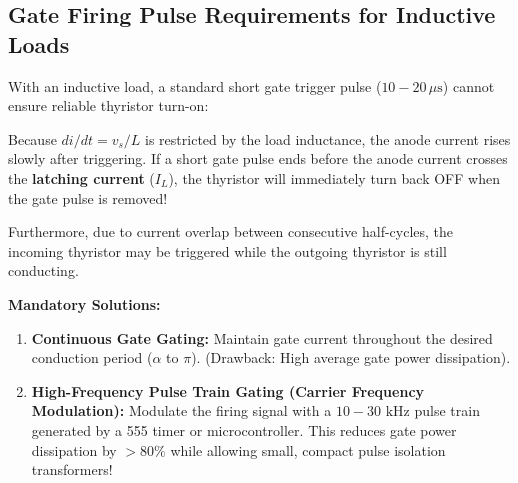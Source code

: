\documentclass[11pt,a4paper]{article}
\let\origsubsection\subsection
\renewcommand{\subsection}{\Needspace{7\baselineskip}\origsubsection}
\begin{document}
\subsection{Gate Firing Pulse Requirements for Inductive Loads}
With an inductive load, a standard short gate trigger pulse ($10 - 20\,\mu\text{s}$) cannot ensure reliable thyristor turn-on:
\begin{conceptbox}
Because $di/dt = v_s/L$ is restricted by the load inductance, the anode current rises slowly after triggering. If a short gate pulse ends before the anode current crosses the \textbf{latching current} ($I_L$), the thyristor will immediately turn back OFF when the gate pulse is removed!

Furthermore, due to current overlap between consecutive half-cycles, the incoming thyristor may be triggered while the outgoing thyristor is still conducting.

\textbf{Mandatory Solutions:}
\begin{enumerate}
  \item \textbf{Continuous Gate Gating:} Maintain gate current throughout the desired conduction period ($\alpha$ to $\pi$). (Drawback: High average gate power dissipation).
  \item \textbf{High-Frequency Pulse Train Gating (Carrier Frequency Modulation):} Modulate the firing signal with a $10 - 30\text{ kHz}$ pulse train generated by a 555 timer or microcontroller. This reduces gate power dissipation by $>80\%$ while allowing small, compact pulse isolation transformers!
\end{enumerate}
\end{conceptbox}
\end{document}
